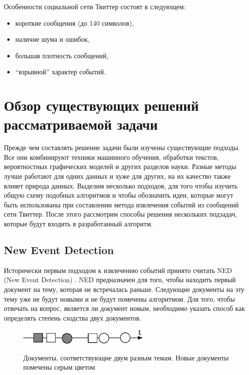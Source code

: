 \documentclass[12pt, a4paper]{article}
\newcommand\todo[1]{\marginpar{\textcolor{red}{#1}}}
\begin{document}
  Особенности социальной сети Твиттер состоят в следующем:
  \begin{itemize}
  \item короткие сообщения (до 140 символов),
  \item наличие шума и ошибок,
  \item большая плотность сообщений,
  \item ``взрывной'' характер событий.
  \end{itemize}
  
  \section{Обзор существующих решений рассматриваемой задачи}
  Прежде чем составлять решение задачи были изучены существующие подходы. Все они комбинируют техники машинного обучения, обработки текстов, вероятностных графических моделей и других разделов науки. Разные методы лучше работают для одних данных и хуже для других, на их качество также влияет природа данных. Выделим несколько подходов, для того чтобы изучить общую схему подобных алгоритмов и чтобы обозначить идеи, которые могут быть использованы при составлении метода извлечения событий из сообщений сети Твиттер. После этого рассмотрим способы решения нескольких подзадач, которые будут входить в разработанный алгоритм.
  
  
  \subsection{New Event Detection}
  \label{ned-subsection}
	Исторически первым подходом к извлечению событий принято считать NED (New Event Detection) \cite{ned}. NED предназначен для того, чтобы находить первый документ на тему, которая не встречалась раньше. Следующие документы на эту тему уже не будут новыми и не будут помечены алгоритмом. Для того, чтобы отвечать на вопрос, является ли документ новым, необходимо указать способ как определять степень сходства двух документов.
	
\begin{figure}[H]
  \centering
  \includegraphics[width=0.58\textwidth]{ned.eps}
  \\
  \caption{Документы, соответствующие двум разным темам. Новые документы помечены серым цветом}
  \end{figure}  
\end{document}
